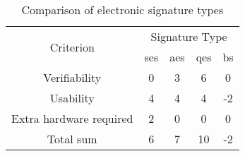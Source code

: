 \begin{table}[H]
	\begin{tabular}{|c|c|c|c|c|} \hline
		\multirow{2}{*}{Criterion} & \multicolumn{4}{|c|}{Signature Type}\\
									& \gls{ses} & \gls{aes} & \gls{qes} & \gls{bs} \\ \cline{1-5}
		Verifiability 			& 0 & 3 & 6 & 0 \\ \hline
		Usability 				& 4 & 4 & 4 & -2 \\ \hline
		Extra hardware required & 2 & 0 & 0 & 0 \\ \hline \hline
		Total sum				& 6 & 7 & 10 & -2 \\ \hline
	\end{tabular}
	\centering
	\caption{Comparison of electronic signature types}
	\label{Tab:comp}
\end{table}